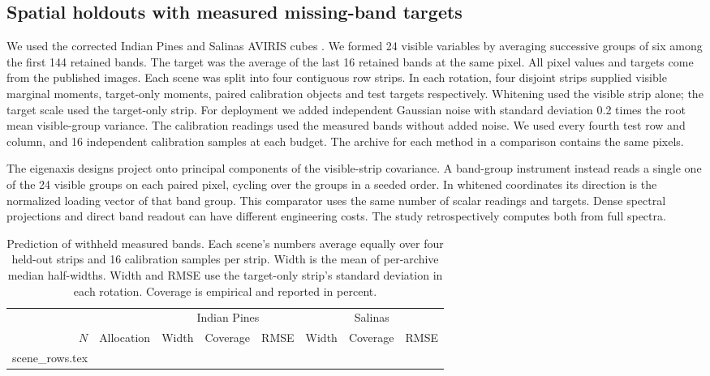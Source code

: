 \subsection{Spatial holdouts with measured missing-band targets}
We used the corrected Indian Pines and Salinas AVIRIS cubes \cite{scenes}. We formed 24 visible variables by averaging successive groups of six among the first 144 retained bands. The target was the average of the last 16 retained bands at the same pixel. All pixel values and targets come from the published images. Each scene was split into four contiguous row strips. In each rotation, four disjoint strips supplied visible marginal moments, target-only moments, paired calibration objects and test targets respectively. Whitening used the visible strip alone; the target scale used the target-only strip. For deployment we added independent Gaussian noise with standard deviation 0.2 times the root mean visible-group variance. The calibration readings used the measured bands without added noise. We used every fourth test row and column, and 16 independent calibration samples at each budget. The archive for each method in a comparison contains the same pixels.

The eigenaxis designs project onto principal components of the visible-strip covariance. A band-group instrument instead reads a single one of the 24 visible groups on each paired pixel, cycling over the groups in a seeded order. In whitened coordinates its direction is the normalized loading vector of that band group. This comparator uses the same number of scalar readings and targets. Dense spectral projections and direct band readout can have different engineering costs. The study retrospectively computes both from full spectra.

\begin{table}[htbp]
\centering
\caption{Prediction of withheld measured bands. Each scene's numbers average equally over four held-out strips and 16 calibration samples per strip. Width is the mean of per-archive median half-widths. Width and RMSE use the target-only strip's standard deviation in each rotation. Coverage is empirical and reported in percent.}
\begin{tabular}{rlrrrrrr}
\toprule
& &\multicolumn{3}{c}{Indian Pines}&\multicolumn{3}{c}{Salinas}\\
\cmidrule(lr){3-5}\cmidrule(lr){6-8}
$N$&Allocation&Width&Coverage&RMSE&Width&Coverage&RMSE\\
\midrule
{} scene_rows.tex
\bottomrule
\end{tabular}\label{tab:scenes}
\end{table}

